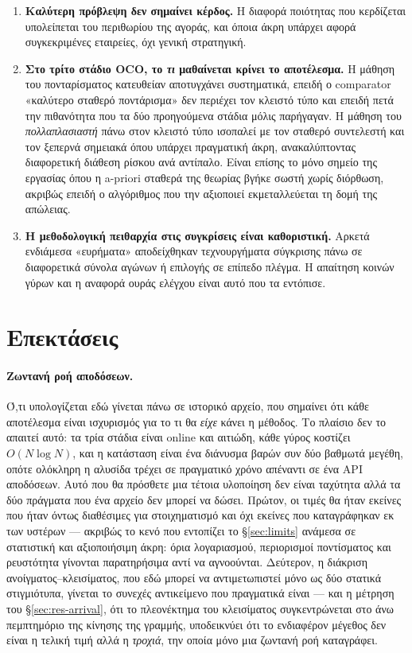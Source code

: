 \documentclass[12pt,a4paper,oneside]{report}
\renewcommand{\_}{\oldunderscore\allowbreak}
\theoremstyle{definition}
\theoremstyle{plain}
\theoremstyle{remark}
\begin{document}
\begin{enumerate}
  \item \textbf{Καλύτερη πρόβλεψη δεν σημαίνει κέρδος.} Η διαφορά ποιότητας που κερδίζεται
        υπολείπεται του περιθωρίου της αγοράς, και όποια άκρη υπάρχει αφορά συγκεκριμένες
        εταιρείες, όχι γενική στρατηγική.

  \item \textbf{Στο τρίτο στάδιο OCO, το \emph{τι} μαθαίνεται κρίνει το αποτέλεσμα.} Η
        μάθηση του πονταρίσματος κατευθείαν αποτυγχάνει συστηματικά, επειδή ο comparator
        «καλύτερο σταθερό ποντάρισμα» δεν περιέχει τον κλειστό τύπο και επειδή πετά την
        πιθανότητα που τα δύο προηγούμενα στάδια μόλις παρήγαγαν. Η μάθηση του
        \emph{πολλαπλασιαστή} πάνω στον κλειστό τύπο ισοπαλεί με τον σταθερό συντελεστή και
        τον ξεπερνά σημειακά όπου υπάρχει πραγματική άκρη, ανακαλύπτοντας διαφορετική
        διάθεση ρίσκου ανά αντίπαλο. Είναι επίσης το μόνο σημείο της εργασίας όπου η
        a-priori σταθερά της θεωρίας βγήκε σωστή χωρίς διόρθωση, ακριβώς επειδή ο
        αλγόριθμος που την αξιοποιεί εκμεταλλεύεται τη δομή της απώλειας.

  \item \textbf{Η μεθοδολογική πειθαρχία στις συγκρίσεις είναι καθοριστική.} Αρκετά
        ενδιάμεσα «ευρήματα» αποδείχθηκαν τεχνουργήματα σύγκρισης πάνω σε διαφορετικά σύνολα
        αγώνων ή επιλογής σε επίπεδο πλέγμα. Η απαίτηση κοινών γύρων και η αναφορά ουράς
        ελέγχου είναι αυτό που τα εντόπισε.
\end{enumerate}

\section{Επεκτάσεις}

\paragraph{Ζωντανή ροή αποδόσεων.} Ό,τι υπολογίζεται εδώ γίνεται πάνω σε ιστορικό αρχείο, που
σημαίνει ότι κάθε αποτέλεσμα είναι ισχυρισμός για το τι θα \emph{είχε} κάνει η μέθοδος. Το
πλαίσιο δεν το απαιτεί αυτό: τα τρία στάδια είναι online και αιτιώδη, κάθε γύρος κοστίζει
$O(N\log N)$, και η κατάσταση είναι ένα διάνυσμα βαρών συν δύο βαθμωτά μεγέθη, οπότε ολόκληρη
η αλυσίδα τρέχει σε πραγματικό χρόνο απέναντι σε ένα API αποδόσεων. Αυτό που θα πρόσθετε μια
τέτοια υλοποίηση δεν είναι ταχύτητα αλλά τα δύο πράγματα που ένα αρχείο δεν μπορεί να δώσει.
Πρώτον, οι τιμές θα ήταν εκείνες που ήταν όντως διαθέσιμες για στοιχηματισμό και όχι εκείνες
που καταγράφηκαν εκ των υστέρων --- ακριβώς το κενό που εντοπίζει το \S\ref{sec:limits}
ανάμεσα σε στατιστική και αξιοποιήσιμη άκρη: όρια λογαριασμού, περιορισμοί ποντίσματος και
ρευστότητα γίνονται παρατηρήσιμα αντί να αγνοούνται. Δεύτερον, η διάκριση
ανοίγματος--κλεισίματος, που εδώ μπορεί να αντιμετωπιστεί μόνο ως δύο στατικά στιγμιότυπα,
γίνεται το συνεχές αντικείμενο που πραγματικά είναι --- και η μέτρηση του
\S\ref{sec:res-arrival}, ότι το πλεονέκτημα του κλεισίματος συγκεντρώνεται στο άνω πεμπτημόριο
της κίνησης της γραμμής, υποδεικνύει ότι το ενδιαφέρον μέγεθος δεν είναι η τελική τιμή αλλά η
\emph{τροχιά}, την οποία μόνο μια ζωντανή ροή καταγράφει.
\end{document}
